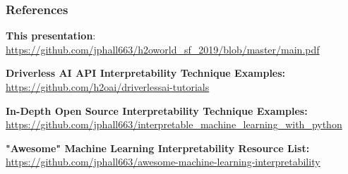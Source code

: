 \documentclass[11pt,
               aspectratio=169,
               hyperref={colorlinks}
               ]{beamer}
\begin{document}

	\begin{frame}[t, allowframebreaks]
	
		\frametitle{References}
		
			\vspace{10pt}	
			
			\textbf{This presentation}:\\
			\small{\url{https://github.com/jphall663/h2oworld_sf_2019/blob/master/main.pdf}}
					
			\vspace{10pt}	
					
			\textbf{Driverless AI API Interpretability Technique Examples:}\\
			\small{\url{https://github.com/h2oai/driverlessai-tutorials}}
			
			\vspace{10pt}		
		
		
			\textbf{In-Depth Open Source Interpretability Technique Examples:}\\
			\small{\url{https://github.com/jphall663/interpretable_machine_learning_with_python}}
			
			\vspace{10pt}
			
			\textbf{"Awesome" Machine Learning Interpretability Resource List:}\\
			\small{\url{https://github.com/jphall663/awesome-machine-learning-interpretability}}
			
		
		\framebreak		
		
		\printbibliography
		
	\end{frame}
\end{document}

